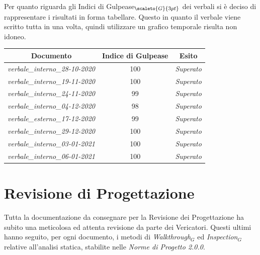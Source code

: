 {Per quanto riguarda gli Indici di Gulpease$_{\scaleto{G}{3pt}}$ dei verbali si è deciso di rappresentare i risultati in forma tabellare.
Questo in quanto il verbale viene scritto tutta in una volta, quindi utilizzare un grafico temporale risulta non idoneo.
\quad
\def\tabularxcolumn#1{m{#1}}
{
	\begin{center}
		\renewcommand{\arraystretch}{1.4}
		\begin{tabularx}{11.65cm}{|c|c|c|}
			\hline
			\rowcolor{airforceblue}
			\textbf{Documento} & \textbf{Indice di Gulpease} & \textbf{Esito}\\
			\hline
			\textit{verbale\_interno\_28-10-2020} & 100  & \textit{Superato}\\
			\hline
			\textit{verbale\_interno\_19-11-2020} & 100 & \textit{Superato}\\
			\hline
			\textit{verbale\_interno\_24-11-2020} & 99 & \textit{Superato}\\
			\hline
			\textit{verbale\_interno\_04-12-2020} & 98 & \textit{Superato}\\
			\hline
			\textit{verbale\_esterno\_17-12-2020} & 99 & \textit{Superato}\\
			\hline
			\textit{verbale\_interno\_29-12-2020} & 100 & \textit{Superato}\\
			\hline
			\textit{verbale\_interno\_03-01-2021} & 100 & \textit{Superato}\\
			\hline
			\textit{verbale\_interno\_06-01-2021} & 100 & \textit{Superato}\\
			\hline
		\end{tabularx}
	\end{center}

\section{Revisione di Progettazione} \label{ResocontoAttivitàDiVerificaRevisioneDiProgettazione}
Tutta la documentazione da consegnare per la Revisione dei Progettazione ha subito una meticolosa ed attenta revisione da parte dei Vericatori. Questi ultimi
hanno seguito, per ogni documento, i metodi di \textit{Walkthrough$_G$} ed \textit{Inspection$_G$} relative all’analisi statica, stabilite nelle \textit{Norme di Progetto 2.0.0}.

}}
